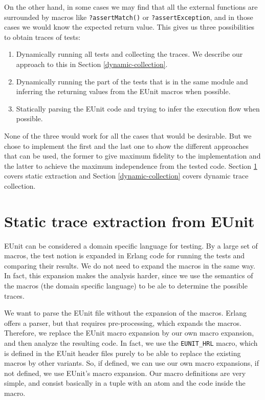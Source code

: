 \documentclass[]{sigplanconf}
\begin{document}
On the other hand, in some cases we may find that all the external
functions are surrounded by macros like \texttt{?assertMatch()} or
\texttt{?assertException}, and in those cases we would know the
expected return value.
This gives us three possibilities to obtain traces of tests:
\begin{enumerate}
 \item Dynamically running all tests and collecting the traces. We describe our approach to this in Section \ref{dynamic-collection}.
 \item Dynamically running the part of the tests that is in the same
module and inferring the returning values from the EUnit macros when
possible.
 \item Statically parsing the EUnit code and trying to infer the
execution flow when possible.
\end{enumerate}
None of the three would work for all the cases that would be desirable.
But we chose to implement the first and the last one to show the different approaches that can be used, the former to give maximum fidelity to the implementation and the latter to achieve the maximum independence from the tested code. Section \ref{static} covers static extraction and Section \ref{dynamic-collection} covers dynamic trace collection.

\section{Static trace extraction from EUnit}
\label{static}

EUnit can be considered a domain specific language for testing. By a large set of macros, the test notion is expanded in Erlang code for running the tests and comparing their results. We do not need to expand the macros in the same way. In fact, this expansion makes the analysis harder, since we use the semantics of the macros (the domain specific language) to be ale to determine the possible traces.

We want to parse the EUnit file without the expansion of the macros. Erlang offers a parser, but that requires pre-processing, which expands the macros.
Therefore, we replace the EUnit macro expansion by our own macro expansion, and then analyze the resulting code. In fact, we use the \verb+EUNIT_HRL+ macro, which is defined in the EUnit 
header files purely to be able to replace the existing macros by other variants. So, if defined, we can use our own macro expansions, if not defined, we use EUnit’s macro expansion.
Our macro definitions are very simple, and consist basically in a tuple with an atom and the code inside the macro.
\end{document}
